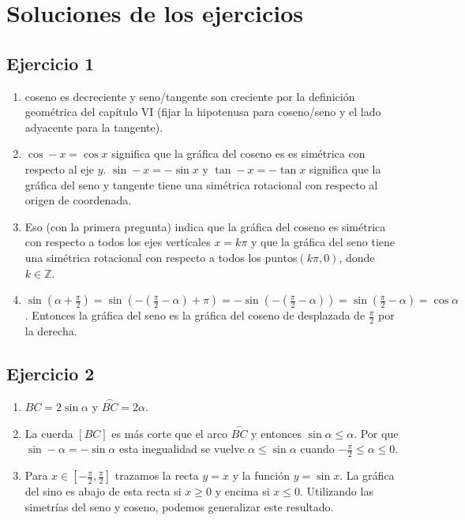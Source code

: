 \section{Soluciones de los ejercicios }

\subsection{Ejercicio 1}

\begin{enumerate}
\item coseno es decreciente y seno/tangente son creciente por la definición
  geométrica del capítulo VI (fijar la hipotenusa para coseno/seno y el lado
  adyacente para la tangente).
\item $\cos -x = \cos x$ significa que la gráfica del coseno es es simétrica
  con respecto al eje $y$. $\sin -x = -\sin x$ y $\tan -x = -\tan x$ significa
  que la gráfica del seno y tangente tiene una simétrica rotacional con
  respecto al origen de coordenada.
\item Eso (con la primera pregunta) indica que la gráfica del coseno es
  simétrica con respecto a todos los ejes vertícales
  $x = k \pi$ y que la gráfica del seno tiene una simétrica rotacional con
  respecto a todos los puntos$(k\pi, 0)$, donde $k \in \mathbb Z$.
\item $\sin\left(\alpha+\frac{\pi}{2}\right) = 
  \sin\left(-\left(\frac{\pi}{2}-\alpha\right) + \pi\right) =
  -\sin\left(-\left(\frac{\pi}{2}-\alpha\right)\right) =
  \sin\left(\frac{\pi}{2}-\alpha\right) = \cos \alpha$.  Entonces la gráfica
  del seno es la gráfica del coseno de desplazada de $\frac{\pi}{2}$ por la
  derecha.
\end{enumerate}

\subsection{Ejercicio 2}

\begin{enumerate}
\item ${BC} = 2\sin{\alpha}$ y $\overset{\frown}{BC} = 2\alpha$.
\item La cuerda $[BC]$ es más corte que el arco $\overset{\frown}{BC}$ y
  entonces $\sin{\alpha} \leq \alpha$. Por que $\sin -\alpha = -{\sin \alpha}$
  esta inegualidad se vuelve $\alpha \leq \sin{\alpha}$ cuando
  $-\frac{\pi}{2} \leq \alpha \leq 0$.
\item Para $x \in \left[-\frac{\pi}{2},\frac{\pi}{2}\right]$ trazamos la
  recta $y = x$ y la función $y = \sin x$. La gráfica del sino es
  abajo de esta recta si $x \geq 0$ y encima si $x \leq 0$. Utilizando las
  simetrías del seno y coseno, podemos generalizar este resultado.
\end{enumerate}


